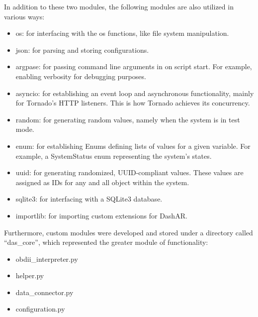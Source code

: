             \par In addition to these two modules, the following modules are also utilized in various ways:

            \begin{itemize}
                \item os: for interfacing with the \gls{os} functions, like file system manipulation.
                \item json: for parsing and storing configurations.
                \item argpase: for passing command line arguments in on script start. For example, enabling verbosity for debugging purposes.
                \item asyncio: for establishing an event loop and asynchronous functionality, mainly for Tornado's HTTP listeners. This is how Tornado achieves its concurrency.
                \item random: for generating random values, namely when the system is in test mode.
                \item enum: for establishing Enums defining lists of values for a given variable. For example, a SystemStatus enum representing the system's states.
                \item uuid: for generating randomized, UUID-compliant values. These values are assigned as IDs for any and all object within the system.
                \item sqlite3: for interfacing with a SQLite3 database.
                \item importlib: for importing custom extensions for DashAR.
            \end{itemize}

            \par Furthermore, custom modules were developed and stored under a directory called ``das\_core'', which represented the greater module of functionality:

            \begin{itemize}
                \item obdii\_interpreter.py
                \item helper.py
                \item data\_connector.py
                \item configuration.py
            \end{itemize}

